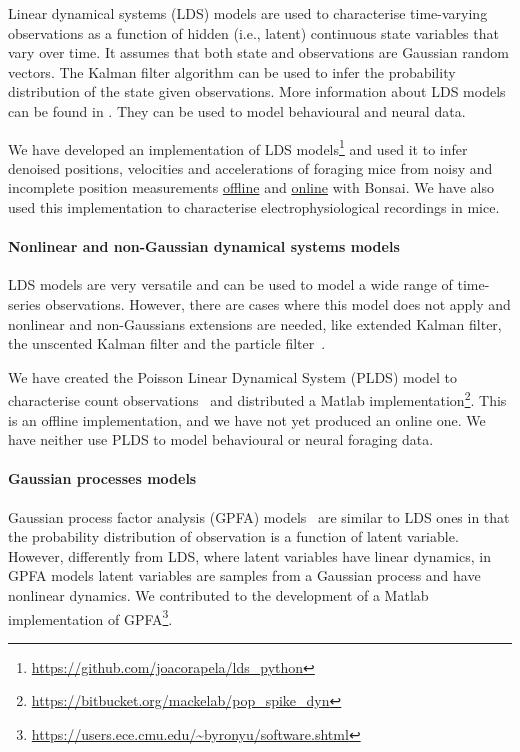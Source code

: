 Linear dynamical systems (LDS) models are used to characterise time-varying
observations as a function of hidden (i.e., latent) continuous state variables
that vary over time. It assumes that both state and observations are Gaussian
random vectors. The Kalman filter algorithm can be used to infer the
probability distribution of the state given observations. More information
about LDS models can be found in \citep[][part I]{durbinAndKoopman12}. They can
be used to model behavioural and neural data.

We have developed an implementation of LDS
models\footnote{\url{https://github.com/joacorapela/lds\_python}} and used it to infer denoised
positions, velocities and accelerations of foraging mice from noisy and
incomplete position measurements
\href{https://joacorapela.github.io/lds\_python/auto\_examples/tracking/plotFilterFWGMouseTrajectoryManualVsLearnedParams.html}{offline}
and
\href{https://bonsai-rx.org/machinelearning/examples/examples/LinearDynamicalSystems/Kinematics/ForagingMouse/README.html}{online}
with Bonsai.
%
We have also used this implementation to characterise electrophysiological recordings in mice.

\paragraph{Nonlinear and non-Gaussian dynamical systems models}

LDS models are very versatile and can be used to model a wide range of
time-series observations. However, there are cases where this model does not
apply and nonlinear and non-Gaussians extensions are needed, like extended
Kalman filter, the unscented Kalman filter and the particle
filter~\citep[][part II]{durbinAndKoopman12}.

We have created the Poisson Linear Dynamical System (PLDS) model to characterise count
observations~\citep{mackeEtAl15} and distributed a Matlab
implementation\footnote{\url{https://bitbucket.org/mackelab/pop\_spike\_dyn}}.
This is an offline implementation, and we have not yet produced an online one.
We have neither use PLDS to model behavioural or neural foraging data.

\paragraph{Gaussian processes models}

Gaussian process factor analysis (GPFA) models~\citep{yuEtAl09} are similar to
LDS ones in that the probability distribution of observation is a function of
latent variable. However, differently from LDS, where latent variables have
linear dynamics, in GPFA models latent variables are samples from a Gaussian
process and have nonlinear dynamics. We contributed to the development of a
Matlab implementation of
GPFA\footnote{\url{https://users.ece.cmu.edu/~byronyu/software.shtml}}.

